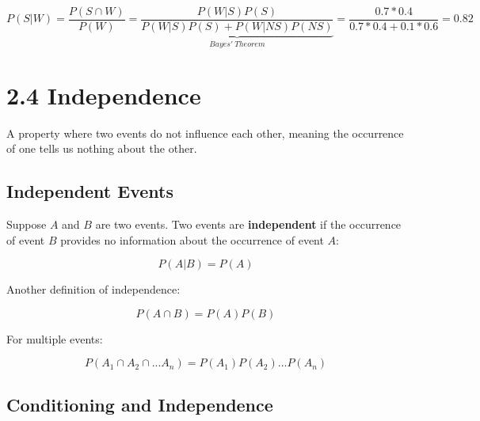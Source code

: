 \documentclass[
  letterpaper,
  DIV=11,
  numbers=noendperiod]{scrreprt}
\begin{document}
\begin{tcolorbox}[enhanced jigsaw, toprule=.15mm, leftrule=.75mm, coltitle=black, left=2mm, opacityback=0, titlerule=0mm, arc=.35mm, toptitle=1mm, opacitybacktitle=0.6, bottomtitle=1mm, colframe=quarto-callout-tip-color-frame, title=\textcolor{quarto-callout-tip-color}{\faLightbulb}\hspace{0.5em}{Solution}, rightrule=.15mm, bottomrule=.15mm, colbacktitle=quarto-callout-tip-color!10!white, breakable, colback=white]

\[
P(S|W) = \frac{P(S \cap W)}{P(W)} = \underbrace{\frac{P(W|S)P(S)}{P(W|S)P(S) + P(W|NS)P(NS)}}_{Bayes' \ Theorem} = \frac{0.7 * 0.4}{0.7 * 0.4 + 0.1 * 0.6} = 0.82
\]

\end{tcolorbox}

\chapter{2.4 Independence}\label{independence}

\begin{tcolorbox}[enhanced jigsaw, arc=.35mm, toprule=.15mm, leftrule=.75mm, colback=white, left=2mm, colframe=quarto-callout-note-color-frame, rightrule=.15mm, opacityback=0, breakable, bottomrule=.15mm]

A property where two events do not influence each other, meaning the
occurrence of one tells us nothing about the other. 🔗

\end{tcolorbox}

\section{Independent Events}\label{independent-events}

Suppose \(A\) and \(B\) are two events. Two events are
\textbf{independent} if the occurrence of event \(B\) provides no
information about the occurrence of event \(A\):

\[ 
P(A|B) = P(A) 
\]

Another definition of independence:

\[ 
P(A \cap B) = P(A) P(B)
\]

For multiple events:

\[ 
P(A_{1} \cap A_{2} \cap ... A_{n}) = P(A_{1}) P(A_{2}) ... P(A_{n})
\]

\section{Conditioning and
Independence}\label{conditioning-and-independence}
\end{document}
